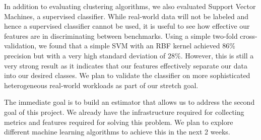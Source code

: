 In addition to evaluating clustering algorithms, we also evaluated
Support Vector Machines, a supervised classifier. While real-world
data will not be labeled and hence a supervised classifier cannot be
used, it is useful to see how effective our features are in
discriminating between benchmarks. Using a simple two-fold
cross-validation, we found that a simple SVM with an RBF kernel
achieved 86\% precision but with a very high standard deviation of
28\%. However, this is still a very strong result as it indicates that
our features effectively separate our data into our desired
classes. 
We plan to validate the classifier on more sophisticated heterogeneous 
real-world workloads as part of our stretch goal.

The immediate goal is to build an estimator that allows us to address the
second goal of this project. We already have the infrastructure required
for collecting metrics and features required for solving this problem.
We plan to explore different machine learning algorithms to achieve this
in the next 2 weeks.
 


